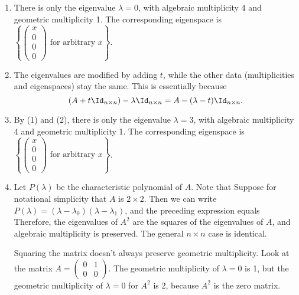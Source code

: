 \documentclass[10pt]{amsart}
\theoremstyle{mythm}
\theoremstyle{definition}
\theoremstyle{myrmk}
\begin{document}
	\begin{enumerate}[label=(\arabic*)]
		\item There is only the eigenvalue $\lambda = 0$, with algebraic multiplicity 4 and geometric multiplicity 1. The corresponding eigenspace is $\left\{\begin{pmatrix}
		x \\ 0 \\ 0 \\ 0 
		\end{pmatrix} \text{ for arbitrary } x \right\}$. 
		\item The eigenvalues are modified by adding $t$, while the other data (multiplicities and eigenspaces) stay the same. This is essentially because 
		\[
			(A + t \Id_{n \times n}) - \lambda \Id_{n \times n} = A - (\lambda - t) \Id_{n \times n}. 
		\]
		\item By (1) and (2), there is only the eigenvalue $\lambda = 3$, with algebraic multiplicity 4 and geometric multiplicity 1. The corresponding eigenspace is $\left\{\begin{pmatrix}
		x \\ 0 \\ 0 \\ 0 
		\end{pmatrix} \text{ for arbitrary } x \right\}$. 
		\item Let $P(\lambda)$ be the characteristic polynomial of $A$. Note that 
		Suppose for notational simplicity that $A$ is $2 \times 2$. Then we can write $P(\lambda) = (\lambda - \lambda_0)(\lambda - \lambda_1)$, and the preceding expression equals 
		Therefore, the eigenvalues of $A^2$ are the squares of the eigenvalues of $A$, and algebraic multiplicity is preserved. The general $n \times n$ case is identical. 
		
		Squaring the matrix doesn't always preserve geometric multiplicity. Look at the matrix $A = \begin{pmatrix}
		0 & 1 \\ 0 & 0
		\end{pmatrix}$. The geometric multiplicity of $\lambda = 0$ is 1, but the geometric multiplicity of $\lambda = 0$ for $A^2$ is 2, because $A^2$ is the zero matrix. 
		

\end{enumerate}
\end{document}

